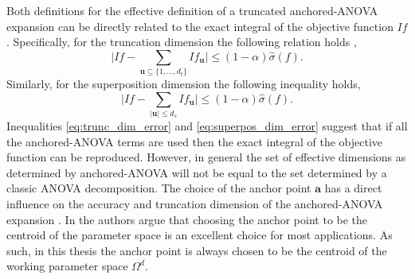 Both definitions for the effective definition of a truncated anchored-\ac{ANOVA} expansion can be directly related to the exact integral of the objective function $If$. Specifically, for the truncation dimension the following relation holds \cite{Holtz},
\begin{equation} \label{eq:trunc_dim_error}
    \vert If -  
     \sum_{\textbf{u} \subseteq \lbrace 1,...,d_t\rbrace}
      If_\textbf{u} 
    \vert \leq \left(1-\alpha\right) \hat{\sigma}\left(f\right).
\end{equation}
Similarly, for the superposition dimension the following inequality holds,
\begin{equation} \label{eq:superpos_dim_error}
    \vert If -  
     \sum_{\vert \textbf{u} \vert \leq d_s}
      If_\textbf{u} 
    \vert \leq \left(1-\alpha\right) \hat{\sigma}\left(f\right).
\end{equation}
Inequalities \ref{eq:trunc_dim_error} and \ref{eq:superpos_dim_error} suggest that if all the anchored-\ac{ANOVA} terms are used then the exact integral of the objective function can be reproduced. However, in general the set of effective dimensions as determined by anchored-\ac{ANOVA} will not be equal to the set determined by a classic \ac{ANOVA} decomposition. The choice of the anchor point $\textbf{a}$ has a direct influence on the accuracy and truncation dimension of the anchored-\ac{ANOVA} expansion \cite{Hesthaven_AnchorPoint}. In \cite{Hesthaven_AnchorPoint} the authors argue that choosing the anchor point to be the centroid of the parameter space is an excellent choice for most applications. As such, in this thesis the anchor point is always chosen to be the centroid of the working parameter space $\Omega^d$.    

